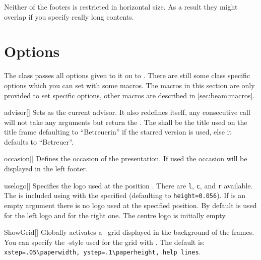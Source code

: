 Neither of the footers is restricted in horizontal size. As a result they might
overlap if you specify really long contents.

\section{Options}
The class passes all options given to it on to . There are still
some class specific options which you can set with some macros. The macros in
this section are only provided to set specific options, other macros are
described in \autoref{sec:beam:macros}.

\begin{describemacro}{advisor}[\meta{*}]
  Sets  as the current advisor. It also redefines itself, any
  consecutive call will not take any arguments but return the . The
   shall be the title used on the title frame defaulting to
  \enquote{Betreuerin} if the starred version is used, else it defaults to
  \enquote{Betreuer}.
\end{describemacro}

\begin{describemacro}{occasion}[]
  Defines the occasion of the presentation. If used the occasion will be
  displayed in the left footer.
\end{describemacro}

\begin{describemacro}{uselogo}[]
  Specifies the logo used at the position . There are \texttt{l},
  \texttt{c}, and \texttt{r} available. The  is included using
   with the specified  (defaulting to
  \texttt{height=0.056}). If  is an empty argument
  there is no logo used at the specified position. By default
   is used for the left logo and
   for the right one. The centre logo is initially
  empty.
\end{describemacro}

\begin{describemacro}{ShowGrid}[]
  Globally activates a \TikZ\ grid displayed in the background of the frames.
  You can specify the \TikZ-style used for the grid with . The
  default is: \verb|xstep=.05\paperwidth, ystep=.1\paperheight, help lines|.
\end{describemacro}


